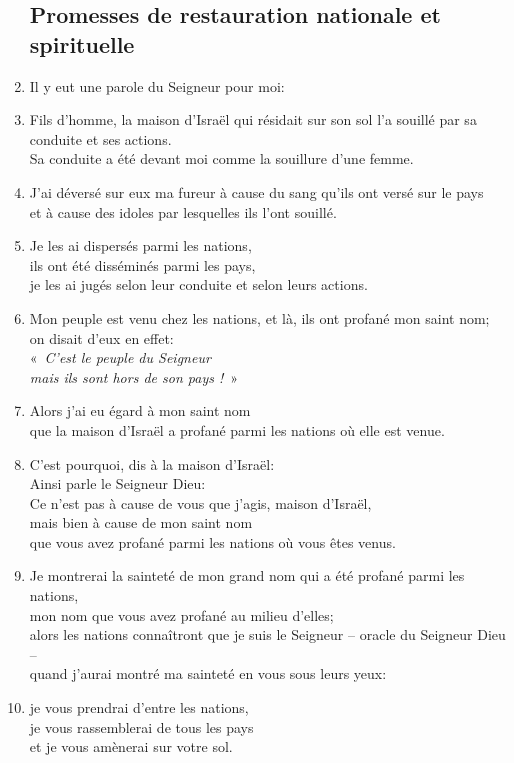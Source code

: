 \begin{enumerate}[leftmargin=\psleftmargin, labelsep = \pslabelsep, label={\arabic*}, font=\color{\pscolor}\small\textsuperscript, parsep=0em, itemsep=0em, topsep=0em ]
\subsection*{Promesses de restauration nationale et spirituelle}
\item Il y eut une parole du Seigneur pour moi:
\item Fils d’homme, la maison d’Israël qui résidait sur son sol l’a souillé par sa conduite et ses actions. \\ Sa conduite a été devant moi comme la souillure d’une femme.
\item J’ai déversé sur eux ma fureur à cause du sang qu’ils ont versé sur le pays \\ et à cause des idoles par lesquelles ils l’ont souillé.
\item Je les ai dispersés parmi les nations, \\ ils ont été disséminés parmi les pays, \\ je les ai jugés selon leur conduite et selon leurs actions.
\item Mon peuple est venu chez les nations, et là, ils ont profané mon saint nom; \\ on disait d’eux en effet: \\ \decalage «~\textit{C’est le peuple du Seigneur \\ \decalage mais ils sont hors de son pays !}~»
\item Alors j’ai eu égard à mon saint nom \\ que la maison d’Israël a profané parmi les nations où elle est venue. \parSpace
\item C’est pourquoi, dis à la maison d’Israël: \\ Ainsi parle le Seigneur Dieu: \\ Ce n’est pas à cause de vous que j’agis, maison d’Israël, \\ mais bien à cause de mon saint nom \\ que vous avez profané parmi les nations où vous êtes venus.
\item Je montrerai la sainteté de mon grand nom qui a été profané parmi les nations, \\ mon nom que vous avez profané au milieu d’elles; \\ alors les nations connaîtront que je suis le Seigneur – oracle du Seigneur Dieu – \\ quand j’aurai montré ma sainteté en vous sous leurs yeux:
\item je vous prendrai d’entre les nations, \\ je vous rassemblerai de tous les pays \\ et je vous amènerai sur votre sol.

\end{enumerate}
